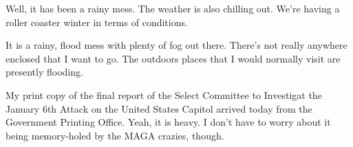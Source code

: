 Well, it has been a rainy mess. The weather is also chilling out. We're
having a roller coaster winter in terms of conditions.

It is a rainy, flood mess with plenty of fog out there. There's not
really anywhere enclosed that I want to go. The outdoors places that I
would normally visit are presently flooding.

My print copy of the final report of the Select Committee to Investigat
the January 6th Attack on the United States Capitol arrived today from
the Government Printing Office. Yeah, it is heavy. I don't have to worry
about it being memory-holed by the MAGA crazies, though.
